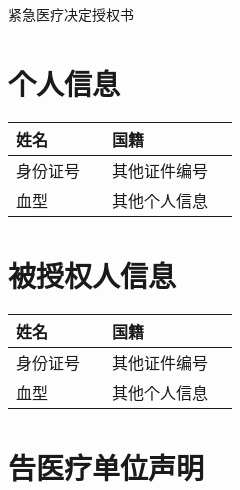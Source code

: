 \documentclass[a4paper,11pt]{article}
\begin{document}
\pagestyle{plain}
\tabulinesep=10pt
\raggedright
\raggedbottom

\sffamily



\begin{minipage}{\linewidth}
	\center
	\huge\bfseries
	\rmfamily

	{紧急医疗决定授权书}
\end{minipage}






\section{个人信息}

\begin{tabu} {|X|X[2.5]|X|X[2.5]|}
	\hline
	{姓名}     & {} & {国籍}         & {} \\
	\hline
	{身份证号} & {} & {其他证件编号} & {} \\
	\hline
	{血型}     & {} & {其他个人信息} & {} \\
	\hline
\end{tabu}

\section{被授权人信息}

\begin{tabu} {|X|X[2.5]|X|X[2.5]|}
	\hline
	{姓名}     & {} & {国籍}         & {} \\
	\hline
	{身份证号} & {} & {其他证件编号} & {} \\
	\hline
	{血型}     & {} & {其他个人信息} & {} \\
	\hline
\end{tabu}

\normalsize

\section{告医疗单位声明}
\end{document}
